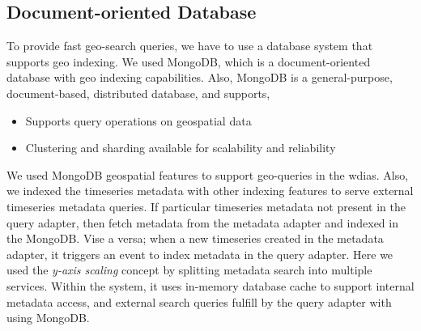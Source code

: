 \subsection{Document-oriented Database}
\label{subse:mongodb}

To provide fast geo-search queries, we have to use a database system that supports geo indexing. We used MongoDB, which is a document-oriented database with geo indexing capabilities. Also, MongoDB \cite{MongoDBMongoDBManual} is a general-purpose, document-based, distributed database, and supports,

\begin{itemize}
  \item Supports query operations on geospatial data \cite{MongoDBMongoDBManual}
  \item Clustering and sharding available for scalability and reliability
\end{itemize}

We used MongoDB geospatial features to support geo-queries in the \acrshort{wdias}. Also, we indexed the timeseries metadata with other indexing features to serve external timeseries metadata queries. If particular timeseries metadata not present in the query adapter, then fetch metadata from the metadata adapter and indexed in the MongoDB. Vise a versa; when a new timeseries created in the metadata adapter, it triggers an event to index metadata in the query adapter.
Here we used the \emph{y-axis scaling} concept by splitting metadata search into multiple services. Within the system, it uses in-memory database cache to support internal metadata access, and external search queries fulfill by the query adapter with using MongoDB.
